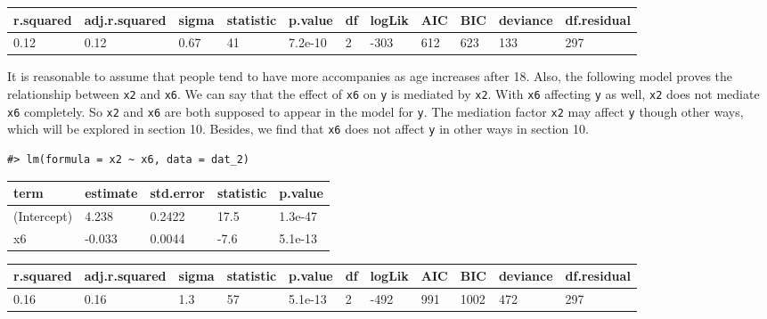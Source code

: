 \documentclass[a4paper]{article}
\begin{document}
\begin{table}[H]
\centering
\begin{tabular}{lllllllllll}
\toprule
r.squared & adj.r.squared & sigma & statistic & p.value & df & logLik & AIC & BIC & deviance & df.residual\\
\midrule
0.12 & 0.12 & 0.67 & 41 & 7.2e-10 & 2 & -303 & 612 & 623 & 133 & 297\\
\bottomrule
\end{tabular}
\end{table}

It is reasonable to assume that people tend to have more accompanies as
age increases after 18. Also, the following model proves the
relationship between \texttt{x2} and \texttt{x6}. We can say that the
effect of \texttt{x6} on \texttt{y} is mediated by \texttt{x2}. With
\texttt{x6} affecting \texttt{y} as well, \texttt{x2} does not mediate
\texttt{x6} completely. So \texttt{x2} and \texttt{x6} are both supposed
to appear in the model for \texttt{y}. The mediation factor \texttt{x2}
may affect \texttt{y} though other ways, which will be explored in
section 10. Besides, we find that \texttt{x6} does not affect \texttt{y}
in other ways in section 10.

\begin{verbatim}
#> lm(formula = x2 ~ x6, data = dat_2)
\end{verbatim}

\begin{table}[H]
\centering
\begin{tabular}{lllll}
\toprule
term & estimate & std.error & statistic & p.value\\
\midrule
(Intercept) & 4.238 & 0.2422 & 17.5 & 1.3e-47\\
x6 & -0.033 & 0.0044 & -7.6 & 5.1e-13\\
\bottomrule
\end{tabular}
\end{table}

\begin{table}[H]
\centering
\begin{tabular}{lllllllllll}
\toprule
r.squared & adj.r.squared & sigma & statistic & p.value & df & logLik & AIC & BIC & deviance & df.residual\\
\midrule
0.16 & 0.16 & 1.3 & 57 & 5.1e-13 & 2 & -492 & 991 & 1002 & 472 & 297\\
\bottomrule
\end{tabular}
\end{table}
\end{document}

